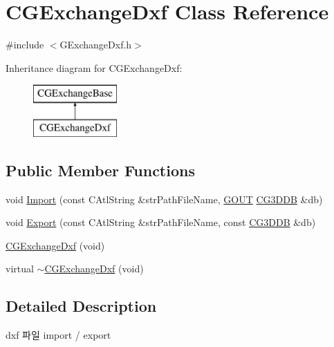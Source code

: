 \hypertarget{class_c_g_exchange_dxf}{}\section{C\+G\+Exchange\+Dxf Class Reference}
\label{class_c_g_exchange_dxf}


{\ttfamily \#include $<$G\+Exchange\+Dxf.\+h$>$}

Inheritance diagram for C\+G\+Exchange\+Dxf\+:\begin{figure}[H]
\begin{center}
\leavevmode
\includegraphics[height=2.000000cm]{class_c_g_exchange_dxf}
\end{center}
\end{figure}
\subsection*{Public Member Functions}
\begin{DoxyCompactItemize}
\item 
void \hyperlink{class_c_g_exchange_dxf_a55fe7c3a2cfc5accf42146da8c8e8f63}{Import} (const C\+Atl\+String \&str\+Path\+File\+Name, \hyperlink{_g_types_8h_a0858ec221262e635612871d70ca233ad}{G\+O\+U\+T} \hyperlink{class_c_g3_d_d_b}{C\+G3\+D\+D\+B} \&db)
\item 
void \hyperlink{class_c_g_exchange_dxf_ac1939beba342af27000c4c972bc70a15}{Export} (const C\+Atl\+String \&str\+Path\+File\+Name, const \hyperlink{class_c_g3_d_d_b}{C\+G3\+D\+D\+B} \&db)
\item 
\hyperlink{class_c_g_exchange_dxf_ad2f799fc9f696d265ed760f9be152eb0}{C\+G\+Exchange\+Dxf} (void)
\item 
virtual \hyperlink{class_c_g_exchange_dxf_a3032d353ba53dba21d7d729f05875a22}{$\sim$\+C\+G\+Exchange\+Dxf} (void)
\end{DoxyCompactItemize}


\subsection{Detailed Description}

\begin{DoxyItemize}
\item dxf 파일 import / export 
\end{DoxyItemize}

